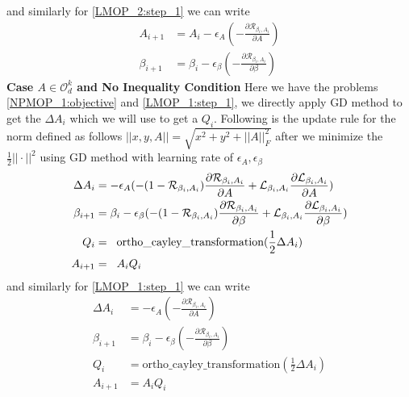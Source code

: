 and similarly for \ref{LMOP_2:step_1} we can write
\begin{equation}
\begin{aligned}
A_{i+1} &= A_{i} - \epsilon_A ( -\frac{\partial \mathcal{R}_{\beta_i, A_i}}{\partial A} )\\
\beta_{i+1} &= \beta_{i} - \epsilon_{\beta} ( -\frac{\partial \mathcal{R}_{\beta_i, A_i}}{\partial \beta} )
\end{aligned}    
\end{equation}
\newline \textbf{Case $A \in \mathcal{O}_d^k$ and No Inequality Condition}
\newline Here we have the problems \ref{NPMOP_1:objective} and \ref{LMOP_1:step_1}, we directly apply GD method to get the $\Delta A_i$ which we will use to get a $Q_i$. Following is the update rule for the norm defined as follows $||x,y,A|| = \sqrt{x^2+y^2+||A||^2_F}$ after we minimize the $\frac{1}{2}||\cdot||^2$ using GD method with learning rate of $\epsilon_A,\epsilon_{\beta}$
\begin{equation}
\begin{aligned}
\Delta A_i &= - \epsilon_A ( -(1-\mathcal{R}_{\beta_i, A_i})\frac{\partial \mathcal{R}_{\beta_i, A_i}}{\partial A} + \mathcal{L}_{\beta_i, A_i} \frac{\partial \mathcal{L}_{\beta_i, A_i}}{\partial A})\\
\beta_{i+1} &= \beta_i - \epsilon_{\beta} ( -(1-\mathcal{R}_{\beta_i, A_i})\frac{\partial \mathcal{R}_{\beta_i, A_i}}{\partial \beta} + \mathcal{L}_{\beta_i, A_i} \frac{\partial \mathcal{L}_{\beta_i, A_i}}{\partial \beta})\\
Q_i &= \hspace{2mm} \text{ortho\_cayley\_transformation}(\frac{1}{2} \Delta A_i)\\
A_{i+1} &= \hspace{2mm} A_i Q_i \\
\end{aligned}    
\end{equation}
and similarly for \ref{LMOP_1:step_1} we can write
\begin{equation}
\begin{aligned}
\Delta A_{i} &= - \epsilon_A ( -\frac{\partial \mathcal{R}_{\beta_i, A_i}}{\partial A} )\\
\beta_{i+1} &= \beta_i - \epsilon_{\beta} ( -\frac{\partial \mathcal{R}_{\beta_i, A_i}}{\partial \beta} )\\
Q_i &= \text{ortho\_cayley\_transformation}(\frac{1}{2} \Delta A_i)\\
A_{i+1} &= A_i Q_i
\end{aligned}    
\end{equation}
